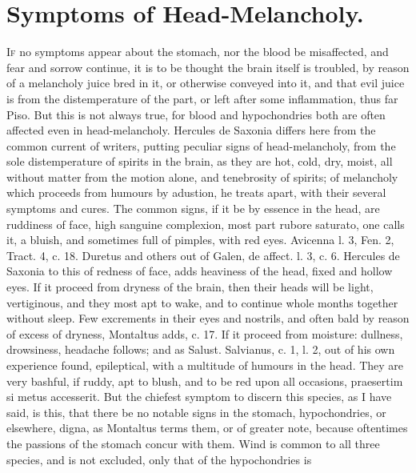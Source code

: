 {%

\section{Symptoms of Head-Melancholy.}

\lettrine{I}{f} no symptoms appear about the stomach, nor the blood be
misaffected, and fear and sorrow continue, it is to be thought the
brain itself is troubled, by reason of a melancholy juice bred in it,
or otherwise conveyed into it, and that evil juice is from the
distemperature of the part, or left after some inflammation, thus far
Piso. But this is not always true, for blood and hypochondries both are
often affected even in head-melancholy. Hercules de Saxonia
differs here from the common current of writers, putting peculiar signs
of head-melancholy, from the sole distemperature of spirits in the
brain, as they are hot, cold, dry, moist, all without matter from the
motion alone, and tenebrosity of spirits; of melancholy which proceeds
from humours by adustion, he treats apart, with their several symptoms
and cures. The common signs, if it be by essence in the head, are
ruddiness of face, high sanguine complexion, most part rubore saturato,
one calls it, a bluish, and sometimes full of pimples, with red
eyes. Avicenna l. 3, Fen. 2, Tract. 4, c. 18. Duretus and others out of
Galen, de affect. l. 3, c. 6. Hercules de Saxonia to this of
redness of face, adds heaviness of the head, fixed and hollow eyes.
If it proceed from dryness of the brain, then their heads will be
light, vertiginous, and they most apt to wake, and to continue whole
months together without sleep. Few excrements in their eyes and
nostrils, and often bald by reason of excess of dryness, Montaltus
adds, c. 17. If it proceed from moisture: dullness, drowsiness,
headache follows; and as Salust. Salvianus, c. 1, l. 2, out of his own
experience found, epileptical, with a multitude of humours in the head.
They are very bashful, if ruddy, apt to blush, and to be red upon all
occasions, praesertim si metus accesserit. But the chiefest symptom to
discern this species, as I have said, is this, that there be no notable
signs in the stomach, hypochondries, or elsewhere, digna, as 
Montaltus terms them, or of greater note, because oftentimes the
passions of the stomach concur with them. Wind is common to all three
species, and is not excluded, only that of the hypochondries is
}
